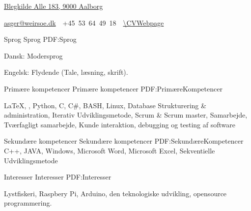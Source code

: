 \documentclass[letterpaper,MMMyyyy,nonstopmode]{simpleresumecv}
\begin{document}


\begin{SubTitle}

\par
\href{https://goo.gl/maps/AmKpus3Um2U2}
{Blegkilde Alle 183, 9000 Aalborg}
\par
\href{mailto:asger@weirsoe.dm}
{asger@weirsoe.dk}
\,\SubBulletSymbol\,
+45\, 53\, 64\, 49\, 18
\,\SubBulletSymbol\,
\href{\CVWebpage}
{\url{\CVWebpage}}
\end{SubTitle}

\begin{Body}







\newpage





\Section
{Sprog}
{Sprog}
{PDF:Sprog}

\BulletItem
Dansk: Modersprog

\Gap
\BulletItem
Engelsk: Flydende (Tale, læsning, skrift).



\Section
{Primære kompetencer}
{Primære kompetencer}
{PDF:PrimæreKompetencer}

\Entry
{\LaTeX}, {\XeLaTeX},
Python, C, C\#, BASH, 
Linux, Database Strukturering \& administration,
Iterativ Udviklingsmetode, 
Scrum \& Scrum master,
Samarbejde,
Tværfagligt samarbejde,
Kunde interaktion, debugging og testing af software


\Section
{Sekundære kompetencer}
{Sekundære kompetencer}
{PDF:SekundæreKompetencer}
\Entry
C++, JAVA, Windows, Microsoft Word, Microsoft Excel, Sekventielle Udviklingsmetode

\BigGap

\Section
{Interesser}
{Interesser}
{PDF:Interesser}

\Entry
Lystfiskeri, Raspbery Pi, Arduino, den teknologiske udvikling, opensource programmering. 




\end{Body}
\end{document}
